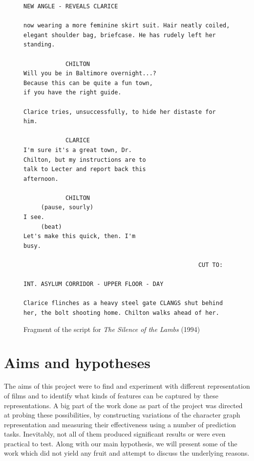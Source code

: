 \documentclass[bsc,frontabs,singlespacing,parskip, twoside]{infthesis}
\begin{document}
\begin{figure}[h!]
\centering
\begin{minipage}{13.2cm}
\begin{Verbatim}[frame=single]
NEW ANGLE - REVEALS CLARICE

now wearing a more feminine skirt suit. Hair neatly coiled, 
elegant shoulder bag, briefcase. He has rudely left her 
standing.

            CHILTON
Will you be in Baltimore overnight...? 
Because this can be quite a fun town, 
if you have the right guide.

Clarice tries, unsuccessfully, to hide her distaste for him.

            CLARICE
I'm sure it's a great town, Dr. 
Chilton, but my instructions are to 
talk to Lecter and report back this 
afternoon.

            CHILTON
     (pause, sourly)
I see.
     (beat)
Let's make this quick, then. I'm 
busy.

                                                  CUT TO:

INT. ASYLUM CORRIDOR - UPPER FLOOR - DAY

Clarice flinches as a heavy steel gate CLANGS shut behind 
her, the bolt shooting home. Chilton walks ahead of her.
\end{Verbatim}
\end{minipage}
\caption{Fragment of the script for \textit{The Silence of the Lambs} (1994)}
\label{fig:lambs_script}
\end{figure}



\chapter{Aims and hypotheses}
\label{chap:aims}

The aims of this project were to find and experiment with different representation of films and to identify what kinds of features can be captured by these representations. A big part of the work done as part of the project was directed at probing these possibilities, by constructing variations of the character graph representation and measuring their effectiveness using a number of prediction tasks. Inevitably, not all of them produced significant results or were even practical to test. Along with our main hypothesis, we will present some of the work which did not yield any fruit and attempt to discuss the underlying reasons.
\end{document}

